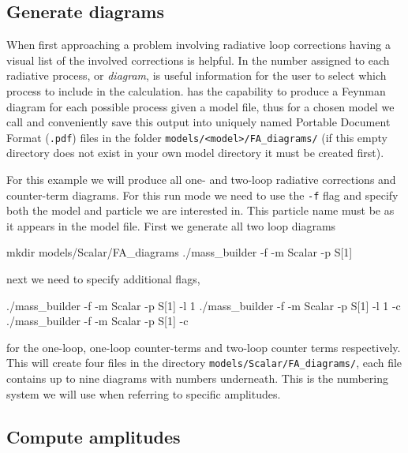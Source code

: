 \subsection{Generate \feynarts diagrams}\label{generate_diagrams}

When first approaching a problem involving radiative loop corrections having a visual list of the involved corrections is helpful.  In \mb the number assigned to each radiative process, or \textit{diagram}, is useful information for the user to select which process to include in the calculation.  \feynarts has the capability to produce a Feynman diagram for each possible process given a model file, thus for a chosen model we call \feynarts and conveniently save this output into uniquely named Portable Document Format (\lstinline{.pdf}) files in the folder \lstinline{models/<model>/FA_diagrams/} (if this empty directory does not exist in your own model directory it must be created first).

For this example we will produce all one- and two-loop radiative corrections and counter-term diagrams.  For this run mode we need to use the \lstinline{-f} flag and specify both the model and particle we are interested in.  This particle name must be as it appears in the \feynarts model file.  First we generate all two loop diagrams
\begin{lstterm}
mkdir models/Scalar/FA_diagrams
./mass_builder -f -m Scalar -p S[1]
\end{lstterm}
next we need to specify additional flags,
\begin{lstterm}
./mass_builder -f -m Scalar -p S[1] -l 1
./mass_builder -f -m Scalar -p S[1] -l 1 -c
./mass_builder -f -m Scalar -p S[1] -c
\end{lstterm}
for the one-loop, one-loop counter-terms and two-loop counter terms respectively.  This will create four files in the directory \lstinline{models/Scalar/FA_diagrams/}, each file contains up to nine diagrams with numbers underneath.  This is the numbering system we will use when referring to specific amplitudes.

\subsection{Compute amplitudes}

